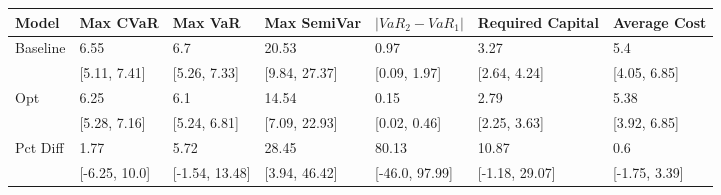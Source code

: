 \begin{tabular}{lllllll}
\toprule
   Model &      Max CVaR &        Max VaR &   Max SemiVar & $|VaR_2 - VaR_1|$ & Required Capital &  Average Cost \\
\midrule
Baseline &          6.55 &            6.7 &         20.53 &              0.97 &             3.27 &           5.4 \\
         &  [5.11, 7.41] &   [5.26, 7.33] & [9.84, 27.37] &      [0.09, 1.97] &     [2.64, 4.24] &  [4.05, 6.85] \\
     Opt &          6.25 &            6.1 &         14.54 &              0.15 &             2.79 &          5.38 \\
         &  [5.28, 7.16] &   [5.24, 6.81] & [7.09, 22.93] &      [0.02, 0.46] &     [2.25, 3.63] &  [3.92, 6.85] \\
Pct Diff &          1.77 &           5.72 &         28.45 &             80.13 &            10.87 &           0.6 \\
         & [-6.25, 10.0] & [-1.54, 13.48] & [3.94, 46.42] &    [-46.0, 97.99] &   [-1.18, 29.07] & [-1.75, 3.39] \\
\bottomrule
\end{tabular}
